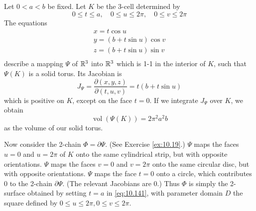 \begin{newexample}
    \label{newexample:10.47}
    Let $0 <a< b$ be fixed. Let $K$ be the 3-cell determined by
    \begin{equation*}
        0 \leq t \leq a , \quad
        0 \leq u \leq 2\pi , \quad
        0 \leq v \leq 2\pi
    \end{equation*}
    The equations
    \begin{equation}
        \label{eq:10.141}
        \begin{array}{l}
            x = t \cos u \\
            y = (b + t \sin u) \cos v \\
            z = (b + t \sin u) \sin v \\
        \end{array}
    \end{equation}
    describe a mapping $\Psi$ of ${\protect\mathbb R}^3$ into ${\protect\mathbb R}^3$ which is 1-1 in the interior of $K$, such that $\Psi(K)$ is a solid torus. Its Jacobian is
    \begin{equation*}
        J_{\Psi} = \frac{\partial(x,y,z)}{\partial(t,u,v)} = t(b+t\sin u)
    \end{equation*}
    which is positive on $K$, except on the face $t = 0$. 
    If we integrate $J_{\Psi}$ over $K$, we obtain
    \begin{equation*}
        \operatorname{vol}(\Psi(K)) = 2 \pi^2 a^2 b
    \end{equation*}
    as the volume of our solid torus.

    Now consider the 2-chain $\Phi = \partial \Psi$. 
    (See Exercise \ref{ex:10.19}.) 
    $\Psi$ maps the faces $u = 0$ and $u = 2\pi$ of $K$ onto the same cylindrical strip, but with opposite orientations. 
    $\Psi$ maps the faces $v = 0$ and $v = 2\pi$ onto the same circular disc, but with opposite orientations.
    $\Psi$ maps the face $t = 0$ onto a circle, which contributes 0 to the 2-chain $\partial \Psi$. 
    (The relevant Jacobians are 0.) 
    Thus $\Phi$ is simply the 2-surface obtained by setting $t = a$ in \eqref{eq:10.141}, with parameter domain $D$ the square defined by $0 \leq u \leq 2\pi, 0 \leq v \leq 2\pi$.


\end{newexample}
